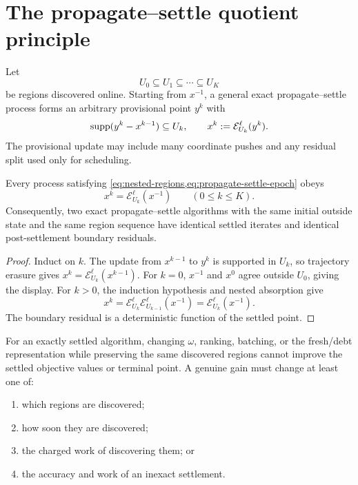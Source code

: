 \section{The propagate--settle quotient principle}
\label{sec:quotient}

Let
\begin{equation}
 U_0\subseteq U_1\subseteq\cdots\subseteq U_K
 \label{eq:nested-regions}
\end{equation}
be regions discovered online.  Starting from $x^{-1}$, a general exact
propagate--settle process forms an arbitrary provisional point $y^k$ with
\begin{equation}
 \operatorname{supp}(y^k-x^{k-1})\subseteq U_k,
 \qquad
 x^k:=\mathcal E_{U_k}^\ell(y^k).
 \label{eq:propagate-settle-epoch}
\end{equation}
The provisional update may include many coordinate pushes and any residual
split used only for scheduling.

\begin{theorem}
\label{thm:region-sequence-quotient}
Every process satisfying
\cref{eq:nested-regions,eq:propagate-settle-epoch} obeys
\begin{equation}
 x^k=\mathcal E_{U_k}^\ell(x^{-1})
 \qquad(0\leq k\leq K).
 \label{eq:canonical-settled-trajectory}
\end{equation}
Consequently, two exact propagate--settle algorithms with the same initial
outside state and the same region sequence have identical settled iterates
and identical post-settlement boundary residuals.
\end{theorem}

\begin{proof}
Induct on $k$.  The update from $x^{k-1}$ to $y^k$ is supported in $U_k$, so
trajectory erasure gives
$x^k=\mathcal E_{U_k}^\ell(x^{k-1})$.  For $k=0$, $x^{-1}$ and $x^0$ agree
outside $U_0$, giving the display.  For $k>0$, the induction hypothesis and
nested absorption give
\[
 x^k
 =\mathcal E_{U_k}^\ell
  \mathcal E_{U_{k-1}}^\ell(x^{-1})
 =\mathcal E_{U_k}^\ell(x^{-1}).
\]
The boundary residual is a deterministic function of the settled point.
\end{proof}

\begin{corollary}
\label{cor:discovery-only-acceleration}
For an exactly settled algorithm, changing $\omega$, ranking, batching, or
the fresh/debt representation while preserving the same discovered regions
cannot improve the settled objective values or terminal point.  A genuine
gain must change at least one of:
\begin{enumerate}[label=(\roman*),leftmargin=*]
 \item which regions are discovered;
 \item how soon they are discovered;
 \item the charged work of discovering them; or
 \item the accuracy and work of an inexact settlement.
\end{enumerate}
\end{corollary}

